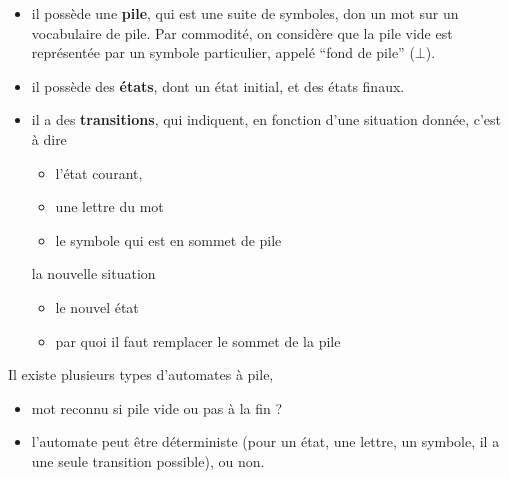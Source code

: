 \documentclass[10pt,twoside]{article}
\begin{document}
\begin{itemize}
\item il possède une \textbf{pile}, qui est une suite de symboles, don un mot sur un  vocabulaire
  de pile.  Par commodité, on considère que la pile vide est
  représentée par un symbole particulier, appelé ``fond de pile'' ($\bot$).
\item il possède des \textbf{états}, dont un état initial, et des états finaux.
\item il a des \textbf{transitions}, qui indiquent, en fonction 
d'une situation donnée, c'est à dire
\begin{itemize}
\item l'état courant,
\item une lettre du mot
\item le symbole qui est en sommet de pile
\end{itemize}
la nouvelle situation 
\begin{itemize}
\item le nouvel état
\item par quoi il faut remplacer le sommet de la pile
\end{itemize}
\end{itemize}

Il existe plusieurs types d'automates à pile, 
\begin{itemize}
\item mot reconnu si pile vide ou pas à la fin ?
\item
l'automate peut être
déterministe (pour un état, une lettre, un symbole, il a une seule
transition possible), ou non.  
\end{itemize}
\end{document}
